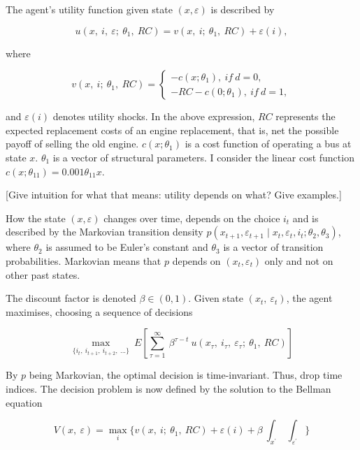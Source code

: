 The agent’s utility function given state $(x, \varepsilon)$ is described by

\begin{equation}
u(x,\ i,\ \varepsilon;\ \theta_1,\ RC)=v(x,\ i;\ \theta_1,\ RC)+\varepsilon(i),
\end{equation}

where

\begin{equation*}
v(x,\ i;\ \theta_1,\ RC)=
\begin{cases}
-c(x; \theta_1),\ if\ d=0,\\
-RC-c(0;\theta_1),\ if\ d=1,
\end{cases}
\end{equation*}

\noindent and $\varepsilon(i)$ denotes utility shocks. In the above expression, $RC$ represents the expected replacement costs of an engine replacement, that is, net the possible payoff of selling the old engine. $c(x; \theta_1)$ is a cost function of operating a bus at state $x$. $\theta_1$ is a vector of structural parameters. I consider the linear cost function $c(x; \theta_{11}) = 0.001 \theta_{11} x$.

[Give intuition for what that means: utility depends on what? Give examples.]

How the state $(x, \varepsilon)$ changes over time, depends on the choice $i_t$ and is described by the Markovian transition density $p(x_{t+1}, \varepsilon_{t+1} \mid x_t, \varepsilon_t, i_t; \theta_2, \theta_3)$, where $\theta_2$ is assumed to be Euler’s constant and $\theta_3$ is a vector of transition probabilities. Markovian means that $p$ depends on $ (x_t, \varepsilon_t) $ only and not on other past states.

The discount factor is denoted $\beta \in (0,1) $. Given state $ (x_t,\ \varepsilon_t) $, the agent maximises, choosing a sequence of decisions

\begin{equation}
\max_{\{i_t,\ i_{t+1},\ i_{t+2},\ ...\}}\ E[\sum_{\tau=1}^\infty\ \beta^{\tau-t}\ u(x_{\tau},\ i_{\tau},\ \varepsilon_{\tau};\ \theta_1,\ RC)]
\end{equation}

By $p$ being Markovian, the optimal decision is time-invariant. Thus, drop time indices. The decision problem is now defined by the solution to the Bellman equation

\begin{equation}
V(x,\ \varepsilon)=\max_i \{v(x,\ i;\ \theta_1,\ RC)+\varepsilon(i)+\beta\ \int_{x^{\prime}}\ \int_{\varepsilon^{\prime}}\}
\end{equation}


